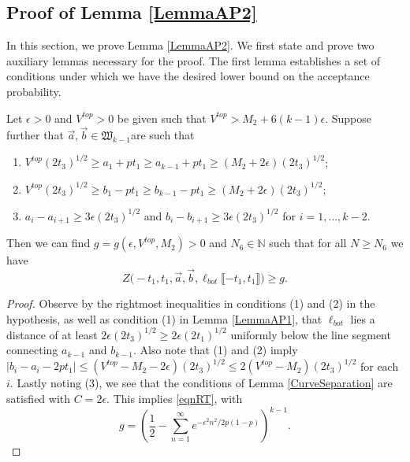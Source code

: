 \subsection{Proof of Lemma \ref{LemmaAP2}} \label{sect62} In this section, we prove Lemma \ref{LemmaAP2}. We first state and prove two auxiliary lemmas necessary for the proof. The first lemma establishes a set of conditions under which we have the desired lower bound on the acceptance probability. 

\begin{lemma}\label{LemmaBP1} Let $\epsilon > 0$ and $V^{top} > 0$ be given such that $V^{top} > M_2 + 6 (k-1) \epsilon$. Suppose further that $\vec{a}, \vec{b} \in \mathfrak{W}_{k-1}$are such that 
	\begin{enumerate}
		\item $V^{top} (2t_3)^{1/2} \geq a_1 + p t_1 \geq a_{k-1} + pt_1 \geq (M_2 + 2 \epsilon) (2t_3)^{1/2}$;
		\item $V^{top} (2t_3)^{1/2} \geq b_1 - p t_1 \geq b_{k-1} - pt_1 \geq (M_2 + 2 \epsilon) (2t_3)^{1/2}$; 
		\item $a_i -a_{i+1} \geq 3\epsilon (2t_3)^{1/2}$ and $b_{i} - b_{i+1} \geq 3 \epsilon (2t_3)^{1/2}$ for $i = 1, \dots, k-2$.
	\end{enumerate}
	Then we can find $g = g(\epsilon, V^{top}, M_2) > 0$ and $N_6 \in \mathbb{N}$ such that for all $N \geq N_6$ we have 
	\begin{equation}\label{eqnRT}
	Z\big(  -t_1, t_1, \vec{a} ,\vec{b}, \ell_{bot}\llbracket -t_1, t_1\rrbracket\big) \geq g.
	\end{equation}
\end{lemma}

\begin{proof}
	
	Observe by the rightmost inequalities in conditions (1) and (2) in the hypothesis, as well as condition (1) in Lemma \ref{LemmaAP1}, that $\ell_{bot}$ lies a distance of at least $2\epsilon(2t_3)^{1/2} \geq 2\epsilon(2t_1)^{1/2}$ uniformly below the line segment connecting $a_{k-1}$ and $b_{k-1}$. Also note that (1) and (2) imply $|b_i-a_i-2pt_1| \leq (V^{top} - M_2-2\epsilon)(2t_3)^{1/2} \leq 2(V^{top} - M_2)(2t_3)^{1/2}$ for each $i$. Lastly noting (3), we see that the conditions of Lemma \ref{CurveSeparation} are satisfied with $C = 2\epsilon$. This implies \eqref{eqnRT}, with
	\[
	g = \left( \frac{1}{2} - \sum_{n=1}^\infty e^{-\epsilon^2n^2/2p(1-p)}\right)^{k-1}.
	\]
	
\end{proof}

